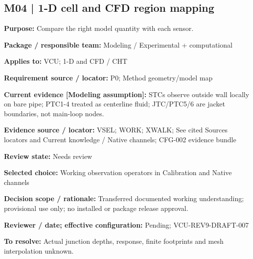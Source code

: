 \documentclass[11pt]{article}
\begin{document}
\par\noindent\begin{minipage}{\textwidth}\small\setlength{\parskip}{2pt}
\subsection*{M04 | 1-D cell and CFD region mapping}
\textbf{Purpose:} Compare the right model quantity with each sensor.\par
\textbf{Package / responsible team:} Modeling / Experimental + computational\par
\textbf{Applies to:} VCU; 1-D and CFD / CHT\par
\textbf{Requirement source / locator:} P0; Method geometry/model map\par
\textbf{Current evidence [Modeling assumption]:} STCs observe outside wall locally on bare pipe; PTC1-4 treated as centerline fluid; JTC/PTC5/6 are jacket boundaries, not main-loop nodes.\par
\textbf{Evidence source / locator:} VSEL; WORK; XWALK; See cited Sources locators and Current knowledge / Native channels; CFG-002 evidence bundle\par
\textbf{Review state:} Needs review\par
\textbf{Selected choice:} Working observation operators in Calibration and Native channels\par
\textbf{Decision scope / rationale:} Transferred documented working understanding; provisional use only; no installed or package release approval.\par
\textbf{Reviewer / date; effective configuration:} Pending; VCU-REV9-DRAFT-007\par
\textbf{To resolve:} Actual junction depths, response, finite footprints and mesh interpolation unknown.\par
\end{minipage}\par\vspace{5pt}
\end{document}

